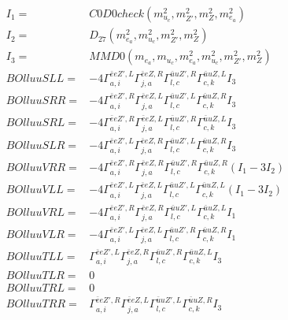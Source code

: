 \documentclass[A4,landscape]{article}
\begin{document}
\begin{align} 
I_1 = & C0D0check(m^2_{u_{{c}}}, m^2_{{Z'}}, m^2_{Z}, m^2_{e_{{a}}}) \\ 
I_2 = & D_{27}(m^2_{e_{{a}}}, m^2_{u_{{c}}}, m^2_{{Z'}}, m^2_{Z}) \\ 
I_3 = & MMD0(m_{e_{{a}}}, m_{u_{{c}}}, m^2_{e_{{a}}}, m^2_{u_{{c}}}, m^2_{{Z'}}, m^2_{Z}) \\ 
  BOlluuSLL= & -4  \Gamma^{\bar{e}e {Z'} ,L}_{a, i} \Gamma^{\bar{e}e Z ,R}_{j, a} \Gamma^{\bar{u}u {Z'} ,R}_{l, c} \Gamma^{\bar{u}u Z ,L}_{c, k} I_3 \\ 
  BOlluuSRR= & -4  \Gamma^{\bar{e}e {Z'} ,R}_{a, i} \Gamma^{\bar{e}e Z ,L}_{j, a} \Gamma^{\bar{u}u {Z'} ,L}_{l, c} \Gamma^{\bar{u}u Z ,R}_{c, k} I_3 \\ 
  BOlluuSRL= & -4  \Gamma^{\bar{e}e {Z'} ,R}_{a, i} \Gamma^{\bar{e}e Z ,L}_{j, a} \Gamma^{\bar{u}u {Z'} ,R}_{l, c} \Gamma^{\bar{u}u Z ,L}_{c, k} I_3 \\ 
  BOlluuSLR= & -4  \Gamma^{\bar{e}e {Z'} ,L}_{a, i} \Gamma^{\bar{e}e Z ,R}_{j, a} \Gamma^{\bar{u}u {Z'} ,L}_{l, c} \Gamma^{\bar{u}u Z ,R}_{c, k} I_3 \\ 
  BOlluuVRR= & -4  \Gamma^{\bar{e}e {Z'} ,R}_{a, i} \Gamma^{\bar{e}e Z ,R}_{j, a} \Gamma^{\bar{u}u {Z'} ,R}_{l, c} \Gamma^{\bar{u}u Z ,R}_{c, k} (I_1 - 3 I_2) \\ 
  BOlluuVLL= & -4  \Gamma^{\bar{e}e {Z'} ,L}_{a, i} \Gamma^{\bar{e}e Z ,L}_{j, a} \Gamma^{\bar{u}u {Z'} ,L}_{l, c} \Gamma^{\bar{u}u Z ,L}_{c, k} (I_1 - 3 I_2) \\ 
  BOlluuVRL= & -4  \Gamma^{\bar{e}e {Z'} ,R}_{a, i} \Gamma^{\bar{e}e Z ,R}_{j, a} \Gamma^{\bar{u}u {Z'} ,L}_{l, c} \Gamma^{\bar{u}u Z ,L}_{c, k} I_1 \\ 
  BOlluuVLR= & -4  \Gamma^{\bar{e}e {Z'} ,L}_{a, i} \Gamma^{\bar{e}e Z ,L}_{j, a} \Gamma^{\bar{u}u {Z'} ,R}_{l, c} \Gamma^{\bar{u}u Z ,R}_{c, k} I_1 \\ 
  BOlluuTLL= &  \Gamma^{\bar{e}e {Z'} ,L}_{a, i} \Gamma^{\bar{e}e Z ,R}_{j, a} \Gamma^{\bar{u}u {Z'} ,R}_{l, c} \Gamma^{\bar{u}u Z ,L}_{c, k} I_3 \\ 
  BOlluuTLR= & 0 \\ 
  BOlluuTRL= & 0 \\ 
  BOlluuTRR= &  \Gamma^{\bar{e}e {Z'} ,R}_{a, i} \Gamma^{\bar{e}e Z ,L}_{j, a} \Gamma^{\bar{u}u {Z'} ,L}_{l, c} \Gamma^{\bar{u}u Z ,R}_{c, k} I_3 \\ 
\end{align} 
\end{document}
